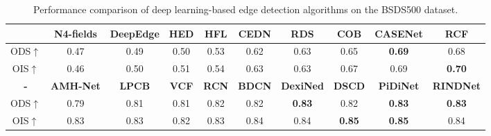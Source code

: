 \documentclass[a4paper, 10pt]{article}
\begin{document}
			\begin{table}[!htbp]
				\centering
				\tiny
					\begin{tabular}{c|c|c|c|c|c|c|c|c|c}
						
						\hline
						
						\textbf{} & \textbf{N4-fields} & \textbf{DeepEdge} & \textbf{HED} & \textbf{HFL} & \textbf{CEDN} &  \textbf{RDS} & \textbf{COB} & \textbf{CASENet} & \textbf{RCF} \\
						
						\hline
						
						ODS$\uparrow$ & 0.47 & 0.49 & 0.50 & 0.53 & 0.62 & 0.63 & 0.65 & \textbf{0.69} & 0.68 \\
						
						OIS$\uparrow$ & 0.46 & 0.50 & 0.51 & 0.54 & 0.63 & 0.63 & 0.67 & 0.69 & \textbf{0.70} \\
						
						\hline
						
						\textbf{-} & \textbf{AMH-Net} & \textbf{LPCB} & \textbf{VCF} & \textbf{RCN} & \textbf{BDCN} &  \textbf{DexiNed} & \textbf{DSCD} & \textbf{PiDiNet} & \textbf{RINDNet} \\
						
						\hline
						
						ODS$\uparrow$ & 0.79 & 0.81 & 0.81 & 0.82 & 0.82 & \textbf{0.83} & 0.82 & \textbf{0.83} & \textbf{0.83} \\
						
						OIS$\uparrow$ & 0.83 & 0.83 & 0.82 & 0.83 & 0.84 & 0.84 & \textbf{0.85} & \textbf{0.85} & 0.84 \\
						
						\hline
						
					\end{tabular}
				\captionsetup{font=scriptsize} 
				\caption{\label{tab: Deep learning on the BSDS500 dataset}
					Performance comparison of deep learning-based edge detection algorithms on the BSDS500 dataset.} 
			\end{table}
			
\end{document}
